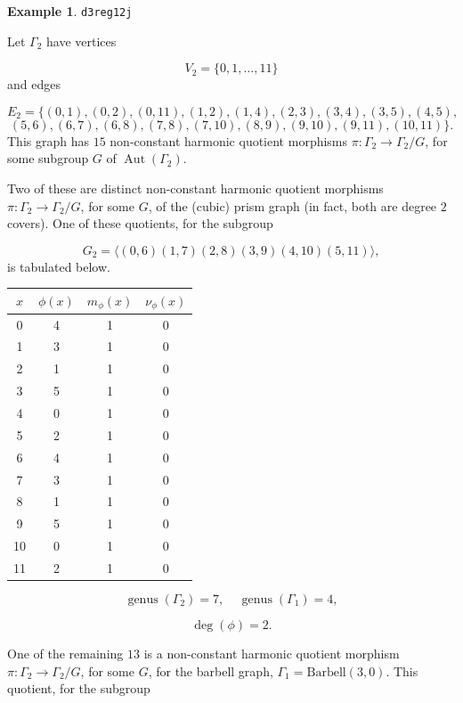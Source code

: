 \documentclass[12pt,letterpaper]{article}
\theoremstyle{definition}
\newtheorem{example}[theorem]{Example}
\DeclareMathOperator{\Aut}{Aut}
\DeclareMathOperator{\genus}{genus}
\begin{document}
\begin{example}%
\label{example:d3reg12j}
  {\tt d3reg12j}\newline
{\rm  
Let $\Gamma_2$ have vertices

\[
V_2=\{0,1,\dots,11\}
\]
and edges

\[
E_2 = \{
(0, 1), (0, 2), (0, 11), (1, 2), (1, 4), (2, 3), (3, 4), (3, 5), (4, 5),
\]
\[
(5, 6), (6, 7), (6, 8), (7, 8), (7, 10), (8, 9), (9, 10), (9, 11), (10, 11)
\}.
\]
This graph has $15$ non-constant harmonic quotient
morphisms $\pi: \Gamma_2\to \Gamma_2/G$, for some subgroup
$G$ of $\Aut(\Gamma_2)$.

Two of these are distinct non-constant harmonic quotient
morphisms $\pi: \Gamma_2\to \Gamma_2/G$, for some $G$, of
the (cubic) prism graph (in fact, both are
degree $2$ covers).
One of these quotients, for the subgroup

\[
G_2=\langle (0,6)(1,7)(2,8)(3,9)(4,10)(5,11) \rangle,
\]
is tabulated below.
\begin{center}
\begin{tabular}{c|c|c|c}  
  $x$ & $\phi(x)$ & $m_\phi(x)$ & $\nu_\phi(x)$ \\ \hline
  0   &    4   &        1         &  0   \\ 
  1   &    3   &        1         &  0   \\ 
  2   &    1   &        1         &  0   \\ 
  3   &    5   &        1         &  0   \\ 
  4   &    0   &        1         &  0   \\ 
  5   &    2   &        1         &  0    \\ 
  6   &    4   &        1         &  0   \\ 
  7   &    3   &        1         &  0   \\
  8   &    1   &        1         &  0   \\
  9   &    5   &        1         &  0   \\
  10  &    0   &        1         &  0   \\
  11  &    2   &        1         &  0   \\ 
\end{tabular}
\end{center}

\[
  \genus(\Gamma_2) =7,\ \ \ \ \
  \genus(\Gamma_1) =4,
\]

\[
\deg(\phi) =2.
\]


One of the remaining $13$ is a non-constant harmonic quotient
morphism $\pi: \Gamma_2\to \Gamma_2/G$, for some $G$,
for the barbell
graph, $\Gamma_1=\mathrm{Barbell}(3,0)$.
This quotient, for the subgroup

}
\end{example}
\end{document}
